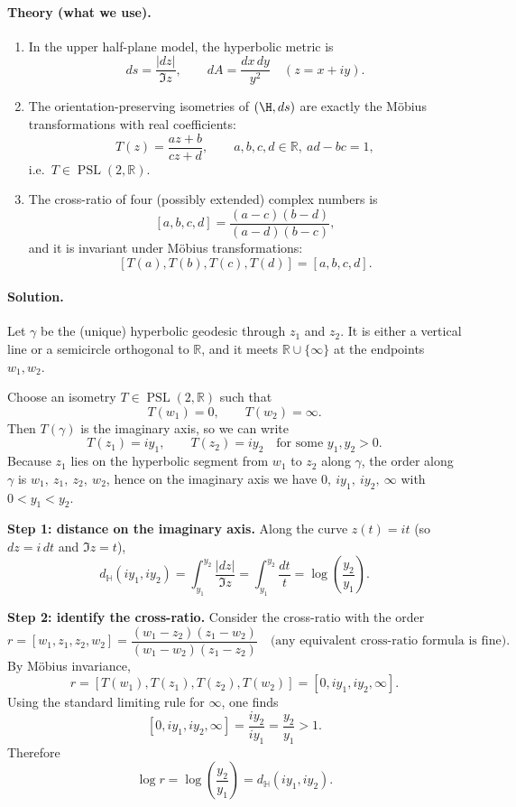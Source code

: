 \documentclass[12pt,a4paper]{article}
\newcommand{\hyp}{\mathbb{H}}
\newcommand{\R}{\mathbb{R}}
\DeclareMathOperator{\PSL}{PSL}
\theoremstyle{plain}
\theoremstyle{definition}      %
\begin{document}
	\paragraph{Theory (what we use).}
	\begin{enumerate}
		\item In the upper half-plane model, the hyperbolic metric is
		\[
		ds=\frac{|dz|}{\Im z},
		\qquad
		dA=\frac{dx\,dy}{y^2}\quad (z=x+iy).
		\]
		\item The orientation-preserving isometries of $(\H,ds)$ are exactly the Möbius
		transformations with real coefficients:
		\[
		T(z)=\frac{az+b}{cz+d},\qquad a,b,c,d\in\R,\ ad-bc=1,
		\]
		i.e.\ $T\in \PSL(2,\R)$.
		\item The cross-ratio of four (possibly extended) complex numbers is
		\[
		[a,b,c,d]=\frac{(a-c)(b-d)}{(a-d)(b-c)},
		\]
		and it is invariant under Möbius transformations:
		\[
		[T(a),T(b),T(c),T(d)]=[a,b,c,d].
		\]
	\end{enumerate}
	
	\paragraph{Solution.}
	Let $\gamma$ be the (unique) hyperbolic geodesic through $z_1$ and $z_2$.
	It is either a vertical line or a semicircle orthogonal to $\R$, and it meets
	$\R\cup\{\infty\}$ at the endpoints $w_1,w_2$.
	
	Choose an isometry $T\in \PSL(2,\R)$ such that
	\[
	T(w_1)=0,\qquad T(w_2)=\infty.
	\]
	Then $T(\gamma)$ is the imaginary axis, so we can write
	\[
	T(z_1)=i y_1,\qquad T(z_2)=i y_2
	\quad\text{for some }y_1,y_2>0.
	\]
	Because $z_1$ lies on the hyperbolic segment from $w_1$ to $z_2$ along $\gamma$,
	the order along $\gamma$ is $w_1,\ z_1,\ z_2,\ w_2$, hence on the imaginary axis
	we have $0,\ i y_1,\ i y_2,\ \infty$ with $0<y_1<y_2$.
	
	\medskip
	\noindent\textbf{Step 1: distance on the imaginary axis.}
	Along the curve $z(t)=it$ (so $dz=i\,dt$ and $\Im z=t$),
	\[
	d_{\hyp}(i y_1,i y_2)=\int_{y_1}^{y_2}\frac{|dz|}{\Im z}
	=\int_{y_1}^{y_2}\frac{dt}{t}
	=\log\!\left(\frac{y_2}{y_1}\right).
	\]
	
	\medskip
	\noindent\textbf{Step 2: identify the cross-ratio.}
	Consider the cross-ratio with the order
	\[
	r=[w_1,z_1,z_2,w_2]
	=\frac{(w_1-z_2)(z_1-w_2)}{(w_1-w_2)(z_1-z_2)}
	\quad\text{(any equivalent cross-ratio formula is fine)}.
	\]
	By Möbius invariance,
	\[
	r=[T(w_1),T(z_1),T(z_2),T(w_2)]=[0, i y_1, i y_2, \infty].
	\]
	Using the standard limiting rule for $\infty$, one finds
	\[
	[0, i y_1, i y_2, \infty]
	=\frac{i y_2}{i y_1}
	=\frac{y_2}{y_1}>1.
	\]
	Therefore
	\[
	\log r=\log\!\left(\frac{y_2}{y_1}\right)=d_{\hyp}(i y_1,i y_2).
	\]
	
\end{document}
